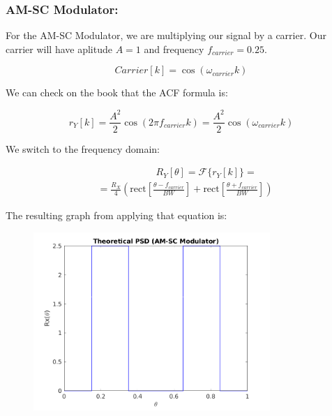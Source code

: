 \documentclass[a4paper,11pt]{article}
\begin{document}
\newpage

\subsubsection{AM-SC Modulator:}

For the AM-SC Modulator, we are multiplying our signal by a carrier. Our
carrier will have aplitude $A = 1$ and frequency $f_{carrier} = 0.25$.

\begin{equation}\label{eq:carrier}
  Carrier[k] = \cos(\omega_{carrier} k)
\end{equation}

We can check on the book that the ACF formula is:

\begin{equation}\label{eq:r_am}
  r_Y[k] = \frac{A^2}{2}\cos(2\pi f_{carrier} k) =
  \frac{A^2}{2}\cos(\omega_{carrier} k)
\end{equation}

We switch to the frequency domain:

\begin{equation}\label{eq:R_am}
  \begin{split}
  & \qquad\qquad\qquad R_Y[\theta] = \mathcal{F}\{r_Y[k]\} = \\
  & =\displaystyle\frac{R_X}{4}(\text{rect}[\frac{\theta - f_{carrier}}{BW}] +
  \text{rect}[\frac{\theta + f_{carrier}}{BW}])
  \end{split}
\end{equation}

The resulting graph from applying that equation is:

\begin{figure}[!hp]
    \begin{center}
      \includegraphics[width=0.8\textwidth]{images/study3/R_th_am.png}
    \end{center}
\end{figure}
\end{document}
